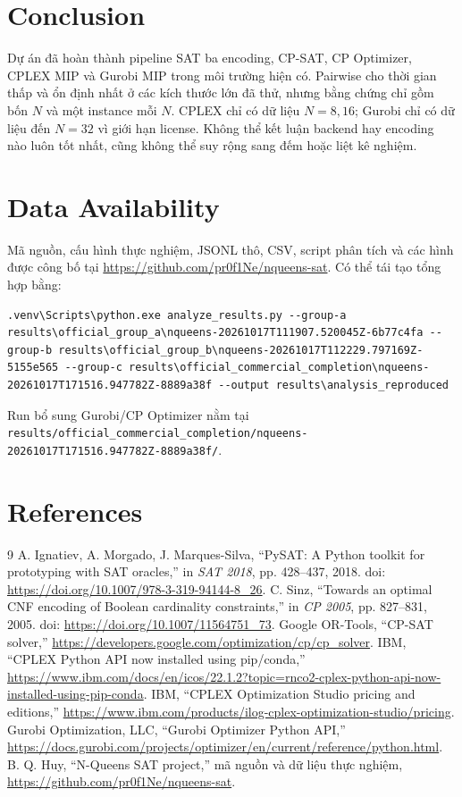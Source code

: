 \documentclass[a4paper,fleqn]{cas-sc}
\begin{document}
\section{Conclusion}
Dự án đã hoàn thành pipeline SAT ba encoding, CP-SAT, CP Optimizer, CPLEX MIP và Gurobi MIP trong môi trường hiện có. Pairwise cho thời gian thấp và ổn định nhất ở các kích thước lớn đã thử, nhưng bằng chứng chỉ gồm bốn $N$ và một instance mỗi $N$. CPLEX chỉ có dữ liệu $N=8,16$; Gurobi chỉ có dữ liệu đến $N=32$ vì giới hạn license. Không thể kết luận backend hay encoding nào luôn tốt nhất, cũng không thể suy rộng sang đếm hoặc liệt kê nghiệm.

\section{Data Availability}
Mã nguồn, cấu hình thực nghiệm, JSONL thô, CSV, script phân tích và các hình được công bố tại \url{https://github.com/pr0f1Ne/nqueens-sat}. Có thể tái tạo tổng hợp bằng:
\begin{verbatim}
.venv\Scripts\python.exe analyze_results.py --group-a results\official_group_a\nqueens-20261017T111907.520045Z-6b77c4fa --group-b results\official_group_b\nqueens-20261017T112229.797169Z-5155e565 --group-c results\official_commercial_completion\nqueens-20261017T171516.947782Z-8889a38f --output results\analysis_reproduced
\end{verbatim}
Run bổ sung Gurobi/CP Optimizer nằm tại \texttt{results/official\_commercial\_completion/nqueens-20261017T171516.947782Z-8889a38f/}.

\section*{References}
\begin{thebibliography}{9}
 A. Ignatiev, A. Morgado, J. Marques-Silva, ``PySAT: A Python toolkit for prototyping with SAT oracles,'' in \textit{SAT 2018}, pp. 428--437, 2018. doi: \url{https://doi.org/10.1007/978-3-319-94144-8_26}.
 C. Sinz, ``Towards an optimal CNF encoding of Boolean cardinality constraints,'' in \textit{CP 2005}, pp. 827--831, 2005. doi: \url{https://doi.org/10.1007/11564751_73}.
 Google OR-Tools, ``CP-SAT solver,'' \url{https://developers.google.com/optimization/cp/cp_solver}.
 IBM, ``CPLEX Python API now installed using pip/conda,'' \url{https://www.ibm.com/docs/en/icos/22.1.2?topic=rnco2-cplex-python-api-now-installed-using-pip-conda}.
 IBM, ``CPLEX Optimization Studio pricing and editions,'' \url{https://www.ibm.com/products/ilog-cplex-optimization-studio/pricing}.
 Gurobi Optimization, LLC, ``Gurobi Optimizer Python API,'' \url{https://docs.gurobi.com/projects/optimizer/en/current/reference/python.html}.
 B. Q. Huy, ``N-Queens SAT project,'' mã nguồn và dữ liệu thực nghiệm, \url{https://github.com/pr0f1Ne/nqueens-sat}.
\end{thebibliography}
\end{document}
